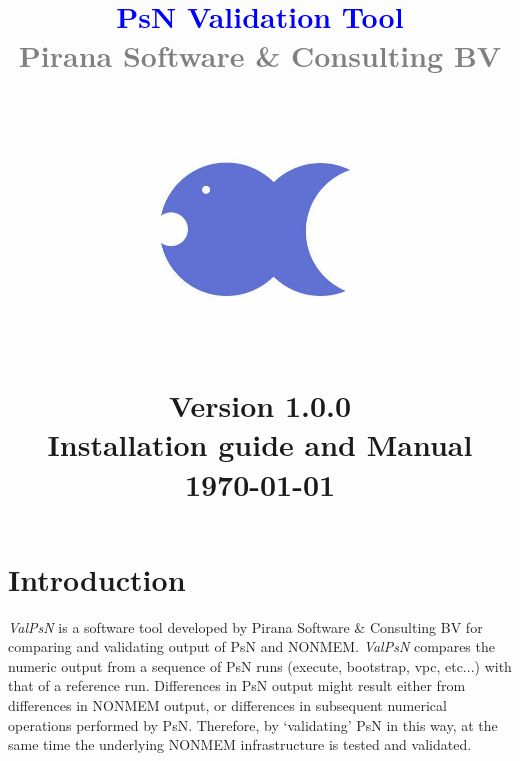 \documentclass[a4,11pt]{report} \usepackage[pdftex]{graphicx}
\newcommand{\ValPsN}{\textcolor{PiranaOrange}{\textit{ValPsN}}\xspace}
\begin{document}
\title{
  \vspace{-100pt}
  \textbf{
  \textcolor{Blue}{\Large PsN Validation Tool}
  }\\
  \vspace{5pt}
  \scriptsize \textcolor{Grey}{Pirana Software \& Consulting BV} \\
  \normalsize
  \vspace{15pt}
  \hspace{15pt}\includegraphics[scale=0.15]{images/pirana_logo_blue.jpg}\\
  \vspace{15pt}
  \scriptsize Version 1.0.0\\Installation guide and Manual \\
  \vspace{5pt}
  \scriptsize {\today} \\
  \date{}
}
\maketitle

\tableofcontents

\chapter{Introduction}

\ValPsN is a software tool developed by Pirana Software \& Consulting
BV for comparing and validating output of PsN and NONMEM. \ValPsN
compares the numeric output from a sequence of PsN runs (execute,
bootstrap, vpc, etc...) with that of a reference run. Differences in
PsN output might result either from differences in NONMEM output, or
differences in subsequent numerical operations performed by
PsN. Therefore, by `validating' PsN in this way, at the same time the
underlying NONMEM infrastructure is tested and validated.
\end{document}

